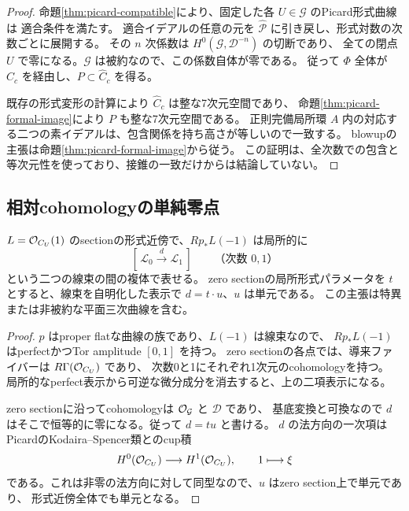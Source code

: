\begin{proof}
命題\ref{thm:picard-compatible}により、固定した各 $U\in\mathcal G$ のPicard形式曲線は
適合条件を満たす。
適合イデアルの任意の元を $\widehat{\mathcal P}$ に引き戻し、形式対数の次数ごとに展開する。
その $n$ 次係数は $H^0(\mathcal G,\mathcal D^{-n})$ の切断であり、
全ての閉点 $U$ で零になる。$\mathcal G$ は被約なので、この係数自体が零である。
従って $\Phi$ 全体が $\widehat C_c$ を経由し、$P\subset\widehat C_c$ を得る。

既存の形式変形の計算により $\widehat C_c$ は整な7次元空間であり、
命題\ref{thm:picard-formal-image}により $P$ も整な7次元空間である。
正則完備局所環 $A$ 内の対応する二つの素イデアルは、包含関係を持ち高さが等しいので一致する。
blowupの主張は命題\ref{thm:picard-formal-image}から従う。
この証明は、全次数での包含と等次元性を使っており、接錐の一致だけからは結論していない。
\end{proof}

\subsection{相対cohomologyの単純零点}

\begin{lemma}\label{lem:relative-picard-theta}
$L=\mathcal O_{C_U}(1)$ のsectionの形式近傍で、$Rp_*L(-1)$ は局所的に
\[
 [\,\mathcal L_0\xrightarrow{\,d\,}\mathcal L_1\,]
 \qquad\text{（次数 }0,1\text{）}
\]
という二つの線束の間の複体で表せる。
zero sectionの局所形式パラメータを $t$ とすると、線束を自明化した表示で
$d=t\cdot u$、$u$ は単元である。
この主張は特異または非被約な平面三次曲線を含む。
\end{lemma}

\begin{proof}
$p$ はproper flatな曲線の族であり、$L(-1)$ は線束なので、
$Rp_*L(-1)$ はperfectかつTor amplitude $[0,1]$ を持つ。
zero sectionの各点では、導来ファイバーは $R\Gamma(\mathcal O_{C_U})$ であり、
次数0と1にそれぞれ1次元のcohomologyを持つ。
局所的なperfect表示から可逆な微分成分を消去すると、上の二項表示になる。

zero sectionに沿ってcohomologyは $\mathcal O_{\mathcal G}$ と $\mathcal D$ であり、
基底変換と可換なので $d$ はそこで恒等的に零になる。従って $d=tu$ と書ける。
$d$ の法方向の一次項はPicardのKodaira--Spencer類とのcup積
\[
 H^0(\mathcal O_{C_U})\longrightarrow H^1(\mathcal O_{C_U}),\qquad1\longmapsto\xi
\]
である。これは非零の法方向に対して同型なので、$u$ はzero section上で単元であり、
形式近傍全体でも単元となる。
\end{proof}

